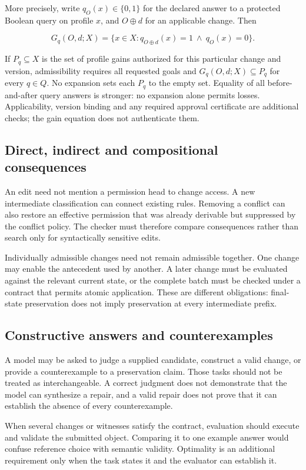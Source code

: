 \documentclass[a4paper,preprint,12pt,numbers,nopreprintline]{elsarticle}
\begin{document}
More precisely, write \(q_O(x)\in\{0,1\}\) for the declared answer to a protected Boolean query on profile \(x\), and \(O\oplus d\) for an applicable change. Then

\[
G_q(O,d;X)=\{x\in X:q_{O\oplus d}(x)=1\ \land\ q_O(x)=0\}.
\]

If \(P_q\subseteq X\) is the set of profile gains authorized for this particular change and version, admissibility requires all requested goals and \(G_q(O,d;X)\subseteq P_q\) for every \(q\in Q\). No expansion sets each \(P_q\) to the empty set. Equality of all before-and-after query answers is stronger: no expansion alone permits losses. Applicability, version binding and any required approval certificate are additional checks; the gain equation does not authenticate them.

\subsection{Direct, indirect and compositional consequences}

An edit need not mention a permission head to change access. A new intermediate classification can connect existing rules. Removing a conflict can also restore an effective permission that was already derivable but suppressed by the conflict policy. The checker must therefore compare consequences rather than search only for syntactically sensitive edits.

Individually admissible changes need not remain admissible together. One change may enable the antecedent used by another. A later change must be evaluated against the relevant current state, or the complete batch must be checked under a contract that permits atomic application. These are different obligations: final-state preservation does not imply preservation at every intermediate prefix.

\subsection{Constructive answers and counterexamples}

A model may be asked to judge a supplied candidate, construct a valid change, or provide a counterexample to a preservation claim. Those tasks should not be treated as interchangeable. A correct judgment does not demonstrate that the model can synthesize a repair, and a valid repair does not prove that it can establish the absence of every counterexample.

When several changes or witnesses satisfy the contract, evaluation should execute and validate the submitted object. Comparing it to one example answer would confuse reference choice with semantic validity. Optimality is an additional requirement only when the task states it and the evaluator can establish it.
\end{document}
